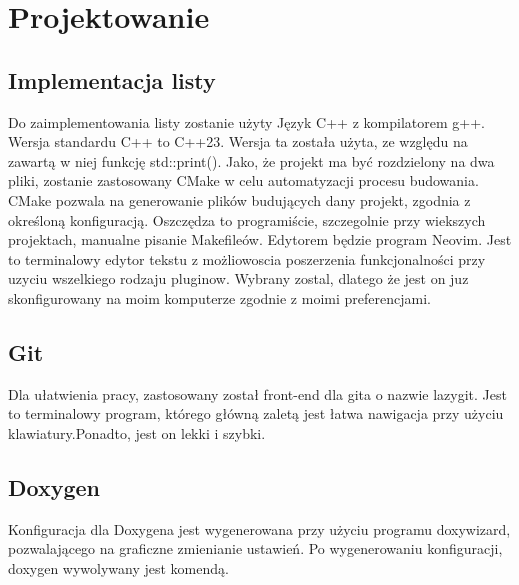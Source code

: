 	\newpage
\section{Projektowanie}		%

\subsection{Implementacja listy}

Do zaimplementowania listy zostanie użyty Język C++ z kompilatorem g++. Wersja standardu C++ to C++23. Wersja ta została użyta, ze względu na zawartą w niej funkcję std::print(). Jako, że projekt ma być rozdzielony na dwa pliki, zostanie zastosowany CMake w celu automatyzacji procesu budowania. CMake pozwala na generowanie plików budujących dany projekt, zgodnia z określoną konfiguracją. Oszczędza to programiście, szczegolnie przy wiekszych projektach, manualne pisanie Makefileów. Edytorem będzie program Neovim. Jest to terminalowy edytor tekstu z możliowoscia poszerzenia funkcjonalności przy uzyciu wszelkiego rodzaju pluginow. Wybrany zostal, dlatego że jest on juz skonfigurowany na moim komputerze zgodnie z moimi preferencjami. 

\subsection{Git}

Dla ułatwienia pracy, zastosowany został front-end dla gita o nazwie lazygit. Jest to terminalowy program, którego główną zaletą jest łatwa nawigacja przy użyciu klawiatury.Ponadto, jest on lekki i szybki.

\subsection{Doxygen}

Konfiguracja dla Doxygena jest wygenerowana przy użyciu programu doxywizard, pozwalającego na graficzne zmienianie ustawień. Po wygenerowaniu konfiguracji, doxygen wywolywany jest komendą. 
